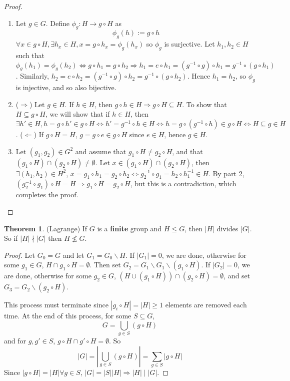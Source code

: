 \documentclass[12pt,a4paper]{article}
\theoremstyle{definition}
\newtheorem{theorem}[definition]{Theorem}
\begin{document}
\begin{proof}
	\hfill
	\begin{enumerate}
		\item Let $g \in G$. Define $\phi_g: H \rightarrow g \circ H$ as
		\[
			\phi_g(h) := g \circ h
		\]
		$\forall x \in g \circ H, \exists h_x \in H, x = g \circ h_x = \phi_g(h_x)$ so $\phi_g$ is surjective. Let $h_1, h_2 \in H$ such that $\phi_g(h_1) = \phi_g(h_2) \Leftrightarrow g \circ h_1 = g \circ h_2 \Rightarrow h_1 = e \circ h_1 = (g^{-1} \circ g) \circ h_1 = g^{-1} \circ (g \circ h_1)$. Similarly, $h_2 = e \circ h_2 = (g^{-1} \circ g) \circ h_2 = g^{-1} \circ (g \circ h_2)$. Hence $h_1 = h_2$, so $\phi_g$ is injective, and so also bijective.
		\item ($\Rightarrow$) Let $g \in H$. If $h \in H$, then $g \circ h \in H \Longrightarrow g \circ H \subseteq H$. To show that $H \subseteq g \circ H$, we will show that if $h \in H$, then $\exists h' \in H, h = g \circ h' \in g \circ H \Longleftrightarrow h' = g^{-1} \circ h \in H \Longleftrightarrow h = g \circ (g^{-1} \circ h) \in g \circ H \Longleftrightarrow H \subseteq g \in H$.
		($\Leftarrow$) If $g \circ H = H$, $g = g \circ e \in g \circ H$ since $e \in H$, hence $g \in H$.
		\item Let $(g_1, g_2) \in G^2$ and assume that $g_1 \circ H \ne g_2 \circ H$, and that $(g_1 \circ H) \cap (g_2 \circ H) \ne \emptyset$. Let $x \in (g_1 \circ H) \cap (g_2 \circ H)$, then $\exists (h_1, h_2) \in H^2$, $x = g_1 \circ h_1 = g_2 \circ h_2 \Longleftrightarrow g_2^{-1} \circ g_1 = h_2 \circ h_1^{-1} \in H$. By part 2, $(g_2^{-1} \circ g_1) \circ H = H \Longrightarrow g_1 \circ H = g_2 \circ H$, but this is a contradiction, which completes the proof.
	\end{enumerate}
\end{proof}
		
\begin{theorem}
	(Lagrange) If $G$ is a \textbf{finite} group and $H \le G$, then $|H|$ divides $|G|$. So if $|H| \nmid |G|$ then $H \not\le G$.
\end{theorem}

\begin{proof}
	Let $G_0 = G$ and let $G_1 = G_0 \backslash H$. If $|G_1| = 0$, we are done, otherwise for some $g_1 \in G$, $H \cap g_1 \circ H = \emptyset$. Then set $G_2 = G_1 \backslash G_1 \backslash (g_1 \circ H)$. If $|G_2| = 0$, we are done, otherwise for some $g_2 \in G$, $(H \cup (g_1 \circ H)) \cap (g_2 \circ H) = \emptyset$, and set $G_3 = G_2 \backslash (g_2 \circ H)$.

	This process must terminate since $|g_i \circ H| = |H| \ge 1$ elements are removed each time. At the end of this process, for some $S \subseteq G$,
	\[
		G = \bigcup_{g \in S} (g \circ H)
	\]
	and for $g, g' \in S$, $g \circ H \cap g' \circ H = \emptyset$. So
	\[
		|G| = \left| \bigcup_{g \in S} (g \circ H) \right| = \sum_{g \in S} | g \circ H |
	\]
	Since $|g \circ H| = |H| \forall g \in S$, $|G| = |S| |H| \Longrightarrow |H| \mid |G|$.
\end{proof}
\end{document}
